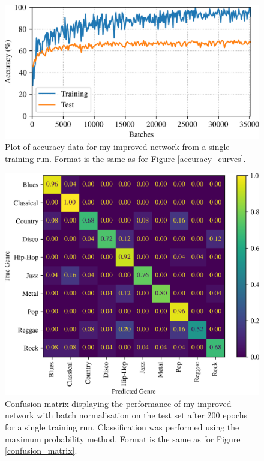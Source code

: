 \documentclass[conference]{IEEEtran}
\begin{document}
\begin{figure}[htbp]
    \centerline{\includegraphics[width=\columnwidth]{accuracy_improved.png}}
    \caption{
        Plot of accuracy data for my improved network from a single training run.
        Format is the same as for Figure \ref{accuracy_curves}.
    }
    \label{accuracy_curves_improved}
\end{figure}

\begin{figure}[htbp]
    \centerline{\includegraphics[width=\columnwidth]{cm_improved.png}}
    \caption{
        Confusion matrix displaying the performance of my improved network with batch normalisation on the test set after 200 epochs for a single training run.
        Classification was performed using the maximum probability method.
        Format is the same as for Figure \ref{confusion_matrix}.
    }
    \label{confusion_matrix_improved}
\end{figure}
\end{document}
